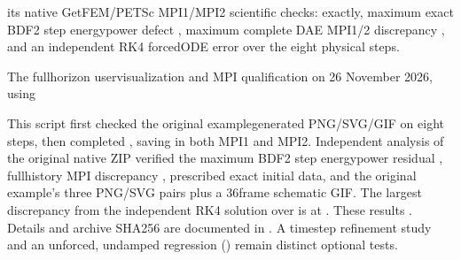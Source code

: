 \documentclass[letterpaper,10pt,english]{sphinxmanual}
\begin{document}
\begin{sphinxVerbatim}[commandchars=\\\{\}]
\end{sphinxVerbatim}

\sphinxAtStartPar
{}
its native GetFEM/PETSc MPI1/MPI2 scientific checks:
 exactly,
maximum exact BDF2 step energy\sphinxhyphen{}power defect
, maximum complete DAE MPI1/2 discrepancy
, and an independent RK4 forced\sphinxhyphen{}ODE error
 over the eight physical steps.

\sphinxAtStartPar
The full\sphinxhyphen{}horizon  user\sphinxhyphen{}visualization and MPI
qualification 
on 26 November 2026, using

\begin{sphinxVerbatim}[commandchars=\\\{\}]
\end{sphinxVerbatim}

\sphinxAtStartPar
This script first checked the original example\sphinxhyphen{}generated PNG/SVG/GIF
on eight steps, then completed , saving
 in both MPI1 and MPI2.
Independent analysis of the original native ZIP
verified the maximum BDF2 step energy\sphinxhyphen{}power residual
, full\sphinxhyphen{}history MPI discrepancy ,
prescribed exact initial data, and the original example’s
three PNG/SVG pairs plus a 36\sphinxhyphen{}frame schematic GIF.
The largest discrepancy from the independent RK4 solution
over \sphinxtitleref{{[}0,8{]}} is  at .
These results . Details and archive
SHA256 are documented in .
A time\sphinxhyphen{}step refinement study and an unforced, undamped
regression () remain distinct optional tests.
\end{document}
